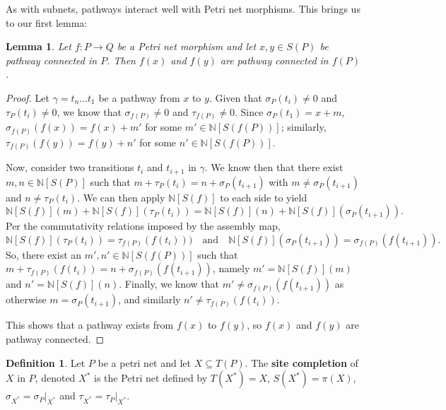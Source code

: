 \documentclass[aps,prd,onecolumn,nofootinbib,letterpaper,preprintnumbers,superscriptaddress,eqsecnum]{revtex4}
\newtheorem{lemma}{Lemma}
\theoremstyle{definition}
\newtheorem{definition}{Definition}
\newcommand{\N}{\mathbb{N}}
\begin{document}
As with subnets, pathways interact well with Petri net morphisms.
This brings us to our first lemma:
\begin{lemma}\label{lem:image-of-pathways}
    Let $f: P \rightarrow Q$ be a Petri net morphism and let $x, y \in S(P)$ be pathway connected in $P$.
    Then $f(x)$ and $f(y)$ are pathway connected in $f(P)$.
\end{lemma}
\begin{proof}
    Let $\gamma = t_n \ldots t_1$ be a pathway from $x$ to $y$.
    Given that $\sigma_P(t_i) \ne 0$ and $\tau_P(t_i) \ne 0$, we know that $\sigma_{f(P)} \ne 0$ and $\tau_{f(P)} \ne 0$.
    Since $\sigma_P(t_1) = x + m$, $\sigma_{f(P)}(f(x)) = f(x) + m'$ for some $m' \in \N[S(f(P))]$; similarly, $\tau_{f(P)}(f(y)) = f(y) + n'$ for some $n' \in \N[S(f(P))]$.

    Now, consider two transitions $t_i$ and $t_{i+1}$ in $\gamma$.
    We know then that there exist $m, n \in \N[S(P)]$ such that $m + \tau_P(t_i) = n + \sigma_P(t_{i+1})$ with $m \ne \sigma_P(t_{i+1})$ and $n \ne \tau_P(t_i)$.
    We can then apply $\N[S(f)]$ to each side to yield
    \begin{equation*}
        \N[S(f)](m) + \N[S(f)](\tau_P(t_i)) = \N[S(f)](n) + \N[S(f)](\sigma_P(t_{i+1})).
    \end{equation*}
    Per the commutativity relations imposed by the assembly map,
    \begin{equation*}
        \N[S(f)](\tau_P(t_i)) = \tau_{f(P)}(f(t_i)))
        \quad\textrm{and}\quad
        \N[S(f)](\sigma_P(t_{i+1})) = \sigma_{f(P)}(f(t_{i+1})).
    \end{equation*}
    So, there exist an $m', n' \in \N[S(f(P))]$ such that $m + \tau_{f(P)}(f(t_i)) = n + \sigma_{f(P)}(f(t_{i+1}))$, namely $m' = \N[S(f)](m)$ and $n' = \N[S(f)](n)$.
    Finally, we know that $m' \ne \sigma_{f(P)}(f(t_{i+1}))$ as otherwise $m = \sigma_P(t_{i+1})$, and similarly $n' \ne \tau_{f(P)}(f(t_i))$.

    This shows that a pathway exists from $f(x)$ to $f(y)$, so $f(x)$ and $f(y)$ are pathway connected.
\end{proof}

\begin{definition}\label{def:site-completion}
    Let $P$ be a petri net and let $X \subseteq T(P)$.
    The \textbf{site completion} of $X$ in $P$, denoted $X^*$ is the Petri net defined by $T(X^*) = X$, $S(X^*) = \pi(X)$, $\sigma_{X^*} = \sigma_P|_{X^*}$ and $\tau_{X^*} = \tau_P|_{X^*}$.
\end{definition}
\end{document}
